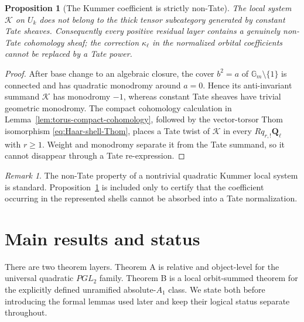 \documentclass[11pt]{article}
\newtheorem{proposition}[theorem]{Proposition}
\theoremstyle{definition}
\theoremstyle{remark}
\newtheorem{remark}[theorem]{Remark}
\newcommand{\Qell}{\mathbf Q_\ell}
\newcommand{\Uk}{U_k}
\newcommand{\kappaell}{\kappa_{\ell}}
\newcommand{\cK}{\mathcal K}
\begin{document}
\begin{proposition}[The Kummer coefficient is strictly non-Tate]
\label{prop:strict-non-Tate-Kummer}
The local system $\cK$ on $\Uk$ does not belong to the thick tensor
subcategory generated by constant Tate sheaves.  Consequently every positive
residual layer contains a genuinely non-Tate cohomology sheaf; the correction
$\kappaell$ in the normalized orbital coefficients cannot be replaced by a
Tate power.
\end{proposition}

\begin{proof}
After base change to an algebraic closure, the cover $b^2=a$ of
$\mathbb G_m\setminus\{1\}$ is connected and has quadratic monodromy around
$a=0$.  Hence its anti-invariant summand $\cK$ has monodromy $-1$, whereas
constant Tate sheaves have trivial geometric monodromy.  The compact
cohomology calculation in Lemma~\ref{lem:torus-compact-cohomology}, followed
by the vector-torsor Thom isomorphism
\eqref{eq:Haar-shell-Thom}, places a Tate twist of $\cK$ in every
$Rq_{r,!}\Qell$ with $r\ge1$.  Weight and monodromy separate it from the Tate
summand, so it cannot disappear through a Tate re-expression.
\end{proof}

\begin{remark}
The non-Tate property of a nontrivial quadratic Kummer local system is
standard.  Proposition~\ref{prop:strict-non-Tate-Kummer} is included only to
certify that the coefficient occurring in the represented shells cannot be
absorbed into a Tate normalization.
\end{remark}


\section{Main results and status}
\label{sec:main-theorem-status}

There are two theorem layers.  Theorem A is relative and object-level for the
universal quadratic $PGL_2$ family.  Theorem B is a local orbit-summed theorem
for the explicitly defined unramified absolute-$A_1$ class.  We state both
before introducing the formal lemmas used later and keep their logical status
separate throughout.
\end{document}

